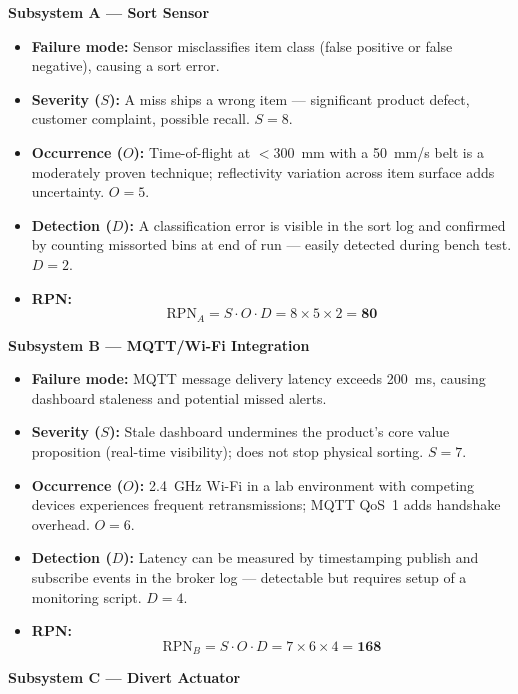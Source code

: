 \bigskip
\noindent\textbf{Subsystem A — Sort Sensor}

\begin{itemize}
  \item \textbf{Failure mode:} Sensor misclassifies item class (false positive or false negative), causing a sort error.
  \item \textbf{Severity ($S$):} A miss ships a wrong item — significant product defect, customer complaint, possible recall. \textbf{$S = 8$}.
  \item \textbf{Occurrence ($O$):} Time-of-flight at $<$300~mm with a 50~mm/s belt is a moderately proven technique; reflectivity variation across item surface adds uncertainty. \textbf{$O = 5$}.
  \item \textbf{Detection ($D$):} A classification error is visible in the sort log and confirmed by counting missorted bins at end of run — easily detected during bench test. \textbf{$D = 2$}.
  \item \textbf{RPN:}
        \[
          \text{RPN}_A = S \cdot O \cdot D = 8 \times 5 \times 2 = \mathbf{80}
        \]
\end{itemize}

\noindent\textbf{Subsystem B — MQTT/Wi-Fi Integration}

\begin{itemize}
  \item \textbf{Failure mode:} MQTT message delivery latency exceeds 200~ms, causing dashboard staleness and potential missed alerts.
  \item \textbf{Severity ($S$):} Stale dashboard undermines the product's core value proposition (real-time visibility); does not stop physical sorting. \textbf{$S = 7$}.
  \item \textbf{Occurrence ($O$):} 2.4~GHz Wi-Fi in a lab environment with competing devices experiences frequent retransmissions; MQTT QoS~1 adds handshake overhead. \textbf{$O = 6$}.
  \item \textbf{Detection ($D$):} Latency can be measured by timestamping publish and subscribe events in the broker log — detectable but requires setup of a monitoring script. \textbf{$D = 4$}.
  \item \textbf{RPN:}
        \[
          \text{RPN}_B = S \cdot O \cdot D = 7 \times 6 \times 4 = \mathbf{168}
        \]
\end{itemize}

\noindent\textbf{Subsystem C — Divert Actuator}

